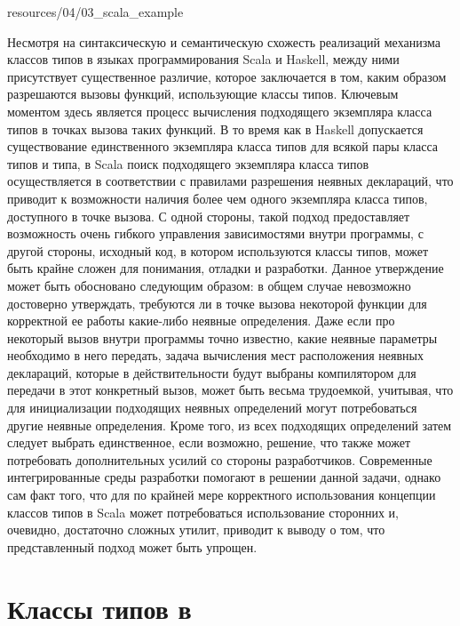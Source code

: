 
{resources/04/03_scala_example}

Несмотря на синтаксическую и семантическую схожесть реализаций механизма классов типов в языках программирования Scala и Haskell, между ними присутствует существенное различие, которое заключается в том, каким образом разрешаются вызовы функций, использующие классы типов. Ключевым моментом здесь является процесс вычисления подходящего экземпляра класса типов в точках вызова таких функций. В то время как в Haskell допускается существование единственного экземпляра класса типов для всякой пары класса типов и типа, в Scala поиск подходящего экземпляра класса типов осуществляется в соответствии с правилами разрешения неявных деклараций, что приводит к возможности наличия более чем одного экземпляра класса типов, доступного в точке вызова. С одной стороны, такой подход предоставляет возможность очень гибкого управления зависимостями внутри программы, с другой стороны, исходный код, в котором используются классы типов, может быть крайне сложен для понимания, отладки и разработки. Данное утверждение может быть обосновано следующим образом: в общем случае невозможно достоверно утверждать, требуются ли в точке вызова некоторой функции для корректной ее работы какие-либо неявные определения. Даже если про некоторый вызов внутри программы точно известно, какие неявные параметры необходимо в него передать, задача вычисления мест расположения неявных деклараций, которые в действительности будут выбраны компилятором для передачи в этот конкретный вызов, может быть весьма трудоемкой, учитывая, что  для инициализации подходящих неявных определений могут потребоваться другие неявные определения. Кроме того, из всех подходящих определений затем следует выбрать единственное, если возможно, решение, что также может потребовать дополнительных усилий со стороны разработчиков. Современные интегрированные среды разработки помогают в решении данной задачи, однако сам факт того, что для по крайней мере корректного использования концепции классов типов в Scala может потребоваться использование сторонних и, очевидно, достаточно сложных утилит, приводит к выводу о том, что представленный подход может быть упрощен.    

\section{Классы типов в \cpp}

